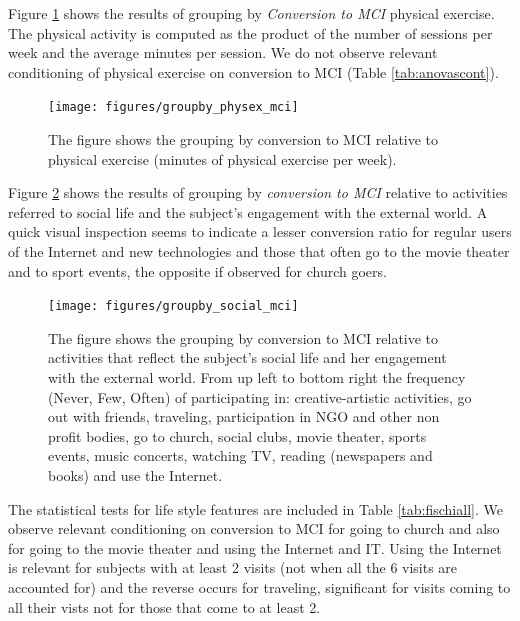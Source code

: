 \documentclass[11pt]{article}
\theoremstyle{definition}
\theoremstyle{remark}
\begin{document}
Figure \ref{fig:groupby_physex_mci} shows the results of grouping by \emph{Conversion to MCI} physical exercise. The physical activity is computed as the product of the number of sessions per week and the average minutes per session.
We do not observe relevant conditioning of physical exercise on conversion to MCI (Table \ref{tab:anovascont}).

\begin{figure}[!htb]
        \centering
        \texttt{[image: figures/groupby\_physex\_mci]}
        \caption{The figure shows the grouping by conversion to MCI relative to physical exercise (minutes of physical exercise per week).} 
        \label{fig:groupby_physex_mci}
\end{figure}

Figure \ref{fig:groupby_social_mci} shows the results of grouping by \emph{conversion to MCI} relative to activities referred to social life and the subject's engagement with the external world. A quick visual inspection seems to indicate a lesser conversion ratio for regular users of the Internet and new technologies and those that often go to the movie theater and to sport events, the opposite if observed for church goers.

\begin{figure}[!htb]
        \centering
        \texttt{[image: figures/groupby\_social\_mci]}
        \caption{The figure shows the grouping by conversion to MCI relative to activities that reflect the subject's social life and her  engagement with the external world. From up left to bottom right the frequency (Never, Few, Often) of participating in: creative-artistic activities, go out with friends, traveling, participation in NGO and other non profit bodies, go to church,  
        social clubs, movie theater, sports events, music concerts, watching TV, reading (newspapers and books) and use the Internet.}
        \label{fig:groupby_social_mci}
\end{figure}

The statistical tests for life style features are included in Table \ref{tab:fischiall}.
We observe relevant conditioning on conversion to MCI for going to church and also for going to the movie theater and using the Internet and IT.
Using the Internet is relevant for subjects with at least 2 visits (not when all the 6 visits are accounted for) and the reverse occurs for traveling, significant for visits coming to all their vists not for those that come to at least 2.
\end{document}
